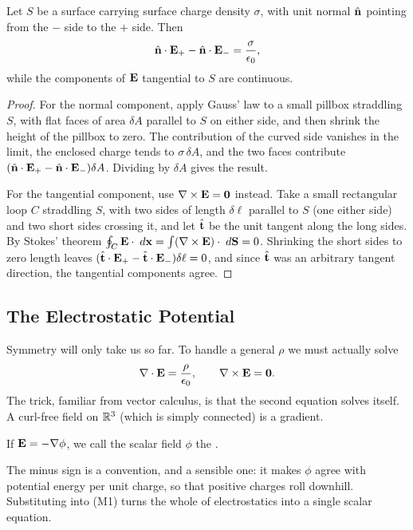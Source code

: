 \documentclass[a4paper]{scrartcl}
\newcommand{\hh}[1]{\hat{\vv{#1}}}
\begin{document}
\begin{proposition}
	\label{prop:jump-E}
	Let $S$ be a surface carrying surface charge density $\sigma$, with unit normal $\hh{n}$ pointing from the $-$ side to the $+$ side. Then
	$$
	\hh{n}\cdot \vv{E}_+ - \hh{n}\cdot\vv{E}_- = \frac{\sigma}{\epsilon_0},
	$$
	while the components of $\mathbf{E}$ tangential to $S$ are continuous.
\end{proposition}
\begin{proof}
	For the normal component, apply Gauss' law to a small pillbox straddling $S$, with flat faces of area $\delta A$ parallel to $S$ on either side, and then shrink the height of the pillbox to zero. The contribution of the curved side vanishes in the limit, the enclosed charge tends to $\sigma \, \delta A$, and the two faces contribute $(\hh{n}\cdot \vv{E}_+ - \hh{n}\cdot \vv{E}_-)\delta A$. Dividing by $\delta A$ gives the result.

	For the tangential component, use $\nabla \times \mathbf{E} = \mathbf{0}$ instead. Take a small rectangular loop $C$ straddling $S$, with two sides of length $\delta \ell$ parallel to $S$ (one either side) and two short sides crossing it, and let $\hh{t}$ be the unit tangent along the long sides. By Stokes' theorem $\oint_C \mathbf{E}\cdot \; d \mathbf{x} = \int (\nabla \times \mathbf{E})\cdot \; d \mathbf{S} = 0$. Shrinking the short sides to zero length leaves $(\hh{t}\cdot \vv{E}_+ - \hh{t}\cdot \vv{E}_-)\delta \ell = 0$, and since $\hh{t}$ was an arbitrary tangent direction, the tangential components agree.
\end{proof}

\subsection{The Electrostatic Potential}

Symmetry will only take us so far. To handle a general $\rho$ we must actually solve
$$
\nabla \cdot \mathbf{E} = \frac{\rho}{\epsilon_0}, \qquad \nabla \times \mathbf{E} = \mathbf{0}.
$$
The trick, familiar from vector calculus, is that the second equation solves itself. A curl-free field on $\mathbb{R}^3$ (which is simply connected) is a gradient.

\begin{definition}
	If $\mathbf{E} = -\nabla \phi$, we call the scalar field $\phi$ the .
\end{definition}

The minus sign is a convention, and a sensible one: it makes $\phi$ agree with potential energy per unit charge, so that positive charges roll downhill. Substituting into (M1) turns the whole of electrostatics into a single scalar equation.
\end{document}
